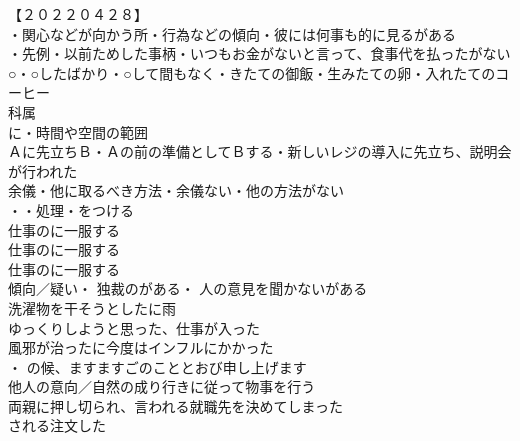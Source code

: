 【２０２２０４２８】\\
・関心などが向かう所・行為などの傾向・彼には何事も的に見るがある\\
・先例・以前ためした事柄・いつもお金がないと言って、食事代を払ったがない\\

○・○したばかり・○して間もなく・きたての御飯・生みたての卵・入れたてのコーヒー\\

科属\\

に・時間や空間の範囲\\
Ａに先立ちＢ・Ａの前の準備としてＢする・新しいレジの導入に先立ち、説明会が行われた\\


余儀・他に取るべき方法・余儀ない・他の方法がない\\
・・処理・をつける\\
仕事のに一服する\\
仕事のに一服する\\
仕事のに一服する\\

傾向／疑い・
独裁のがある・
人の意見を聞かないがある\\

洗濯物を干そうとしたに雨\\
ゆっくりしようと思った、仕事が入った\\
風邪が治ったに今度はインフルにかかった\\

・
の候、ますますごのこととおび申し上げます\\

他人の意向／自然の成り行きに従って物事を行う\\
両親に押し切られ、言われる就職先を決めてしまった\\
される注文した\\

